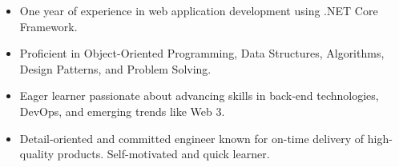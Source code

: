 
\medskip

\begin{itemize}
    \item One year of experience in web application development using .NET Core Framework.
    \item Proficient in Object-Oriented Programming, Data Structures, Algorithms, Design Patterns, and Problem Solving.
    \item Eager learner passionate about advancing skills in back-end technologies, DevOps, and emerging trends like Web 3.
    \item Detail-oriented and committed engineer known for on-time delivery of high-quality products. Self-motivated and quick learner.
\end{itemize}